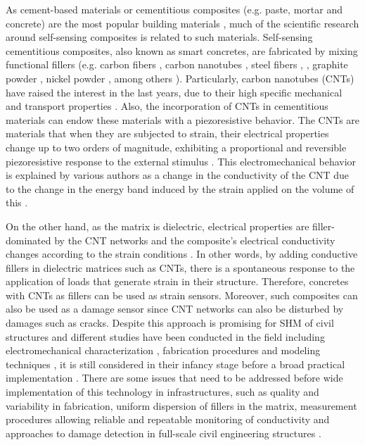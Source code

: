 \documentclass[twocolumn]{bmcart}%
\begin{document}
As cement-based materials or cementitious composites (e.g. paste, mortar and concrete) are the most popular building materials \cite{Xu2017a}, much of the scientific research around self-sensing composites is related to such materials. Self-sensing cementitious composites, also known as smart concretes, are fabricated by mixing functional fillers (e.g. carbon fibers \cite{Baeza2013a,Teomete2015, Sarwary2019a}, carbon nanotubes \cite{Elkashef2015a}, steel fibers \cite{Kang2018b}, \cite{Ding2019}, graphite powder \cite{Simonova2018}, nickel powder \cite{Wang2015} , among others \cite{Tian2019a}). Particularly, carbon nanotubes (CNTs) have raised the interest in the last years, due to their high specific mechanical and transport properties \cite{Schumacher2014,Ubertini2016}. Also, the incorporation of CNTs in cementitious materials can endow these materials with a piezoresistive behavior. The CNTs are materials that when they are subjected to strain, their electrical properties change up to two orders of magnitude, exhibiting a proportional and reversible piezoresistive response to the external stimulus \cite{Garcia-Macias2017, Garcia-Macias2017a, Minot2003}. This electromechanical behavior is explained by various authors as a change in the conductivity of the CNT due to the change in the energy band induced by the strain applied on the volume of this \cite{Minot2003, PHAM2008, Han2015, Njuguna2012, Tjong2009, XinxinSun2009}. 

On the other hand, as the matrix is dielectric, electrical properties are filler-dominated by the CNT networks and the composite’s electrical conductivity changes according to the strain conditions \cite{Tian2019a}.  In other words, by adding conductive fillers in dielectric matrices such as CNTs, there is a spontaneous response to the application of loads that generate strain in their structure. Therefore, concretes with CNTs as fillers can be used as strain sensors. Moreover, such composites can also be used as a damage sensor since CNT networks can also be disturbed by damages such as cracks.
Despite this approach is promising for SHM of civil structures and different studies have been conducted in the field including electromechanical characterization \cite{Ubertini2014, Meoni2018a, Liu2019, Kim2019a}, fabrication procedures \cite{DAlessandro2016, Parvaneh2019a} and modeling techniques \cite{Garcia-Macias2017, Eftekhari2014, Garcia-Macias2018b}, it is still considered in their infancy stage before a broad practical implementation \cite{Taheri2019a}. There are some issues that need to be addressed before wide implementation of this technology in infrastructures, such as quality and variability in fabrication, uniform dispersion of fillers in the matrix, measurement procedures allowing reliable and repeatable monitoring of conductivity and approaches to damage detection in full-scale civil engineering structures \cite{Tian2019a, DAlessandro2016a, Shi2019b}.
\end{document}
